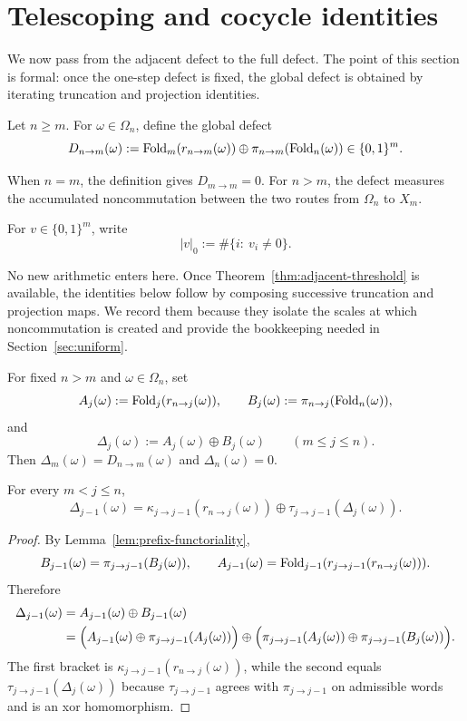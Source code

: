 \section{Telescoping and cocycle identities}
\label{sec:telescoping}

We now pass from the adjacent defect to the full defect.  The point of this
section is formal: once the one-step defect is fixed, the global defect is
obtained by iterating truncation and projection identities.

\begin{definition}
\label{def:global-defect}
Let $n\ge m$.  For $\omega\in\Omega_n$, define the global defect
\[
D_{n\to m}(\omega)
:=
\operatorname{Fold}_m(r_{n\to m}(\omega))
\oplus
\pi_{n\to m}(\operatorname{Fold}_n(\omega))
\in\{0,1\}^m.
\]
\end{definition}

When $n=m$, the definition gives $D_{m\to m}=0$.  For $n>m$, the defect
measures the accumulated noncommutation between the two routes from $\Omega_n$
to $X_m$.

For $v\in\{0,1\}^m$, write
\[
\lvert v\rvert_0:=\#\{i:\ v_i\ne 0\}.
\]

No new arithmetic enters here.  Once
Theorem~\ref{thm:adjacent-threshold} is available, the identities below follow
by composing successive truncation and projection maps.  We record them
because they isolate the scales at which noncommutation is created and provide
the bookkeeping needed in Section~\ref{sec:uniform}.

For fixed $n>m$ and $\omega\in\Omega_n$, set
\[
A_j(\omega):=\operatorname{Fold}_j(r_{n\to j}(\omega)),
\qquad
B_j(\omega):=\pi_{n\to j}(\operatorname{Fold}_n(\omega)),
\]
and
\[
\Delta_j(\omega):=A_j(\omega)\oplus B_j(\omega)
\qquad (m\le j\le n).
\]
Then $\Delta_m(\omega)=D_{n\to m}(\omega)$ and $\Delta_n(\omega)=0$.

\begin{lemma}
\label{lem:adjacent-recursion}
For every $m<j\le n$,
\[
\Delta_{j-1}(\omega)
=
\kappa_{j\to j-1}(r_{n\to j}(\omega))
\oplus
\tau_{j\to j-1}(\Delta_j(\omega)).
\]
\end{lemma}

\begin{proof}
By Lemma~\ref{lem:prefix-functoriality},
\[
B_{j-1}(\omega)=\pi_{j\to j-1}(B_j(\omega)),
\qquad
A_{j-1}(\omega)=\operatorname{Fold}_{j-1}(r_{j\to j-1}(r_{n\to j}(\omega))).
\]
Therefore
\[
\begin{aligned}
\Delta_{j-1}(\omega)
&=A_{j-1}(\omega)\oplus B_{j-1}(\omega) \\
&=
\Bigl(A_{j-1}(\omega)\oplus \pi_{j\to j-1}(A_j(\omega))\Bigr)
\oplus
\Bigl(\pi_{j\to j-1}(A_j(\omega))\oplus \pi_{j\to j-1}(B_j(\omega))\Bigr).
\end{aligned}
\]
The first bracket is $\kappa_{j\to j-1}(r_{n\to j}(\omega))$, while the second
equals $\tau_{j\to j-1}(\Delta_j(\omega))$ because $\tau_{j\to j-1}$ agrees
with $\pi_{j\to j-1}$ on admissible words and is an xor homomorphism.
\end{proof}

